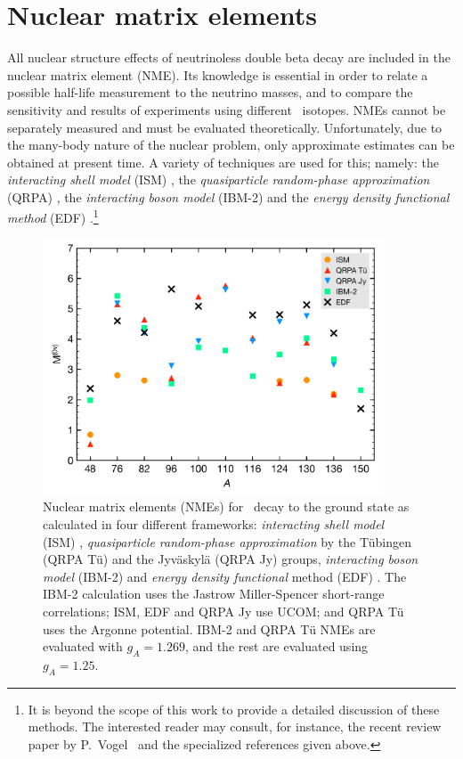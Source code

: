 \documentclass{PoS}
\begin{document}
\section{Nuclear matrix elements} \label{sec:NME}
All nuclear structure effects of neutrinoless double beta decay are included in the nuclear matrix element (NME). Its knowledge is essential in order to relate a possible half-life measurement to the neutrino masses, and to compare the sensitivity and results of experiments using different \bb\ isotopes. NMEs cannot be separately measured and must be evaluated theoretically. Unfortunately, due to the many-body nature of the nuclear problem, only approximate estimates can be obtained at present time. A variety of techniques are used for this; namely: the \emph{interacting shell model} (ISM) \cite{Caurier:2007wq, Menendez:2008jp}, the \emph{quasiparticle random-phase approximation} (QRPA) \cite{Rodin:2007fz, Kortelainen:2007rn}, the \emph{interacting boson model} (IBM-2) \cite{Barea:2013bz} and the \emph{energy density functional method} (EDF) \cite{Rodriguez:2010mn, Vaquero:2014dna}.\footnote{It is beyond the scope of this work to provide a detailed discussion of these methods. The interested reader may consult, for instance, the recent review paper by P.~Vogel~\cite{Vogel:2012ja} and the specialized references given above.}

\begin{figure}
\centering
\includegraphics[width=0.9\textwidth]{img/NME.pdf}
\caption{Nuclear matrix elements (NMEs) for \bbonu\ decay to the ground state as calculated in four different frameworks: \emph{interacting shell model} (ISM) \cite{Menendez:2008jp}, \emph{quasiparticle random-phase approximation} by the T\"ubingen (QRPA T\"u) \cite{Simkovic:2013qiy} and the Jyv\"askyl\"a (QRPA Jy) \cite{Suhonen:2012ii} groups, \emph{interacting boson model} (IBM-2) \cite{Barea:2013bz} and \emph{energy density functional} method (EDF) \cite{Vaquero:2014dna}. 
The IBM-2 calculation uses the Jastrow Miller-Spencer short-range correlations; ISM, EDF and QRPA Jy use UCOM; and QRPA T\"u uses the Argonne potential. 
IBM-2 and QRPA T\"u NMEs are evaluated with $g_{A}=1.269$, and the rest are evaluated using $g_{A}=1.25$.}\label{fig:NME}
\end{figure}
\end{document}
